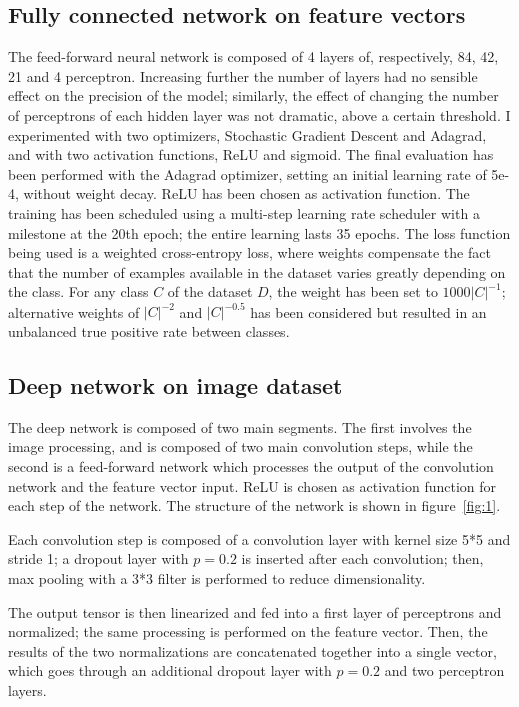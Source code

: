\documentclass[10pt,a4paper,twocolumn]{article}
\begin{document}
\subsection{Fully connected network on feature vectors}

The feed-forward neural network is composed of 4 layers of, respectively, 84, 42, 21 and 4 perceptron.
Increasing further the number of layers had no sensible effect on the precision of the model; similarly, the effect of changing the number of perceptrons of each hidden layer was not dramatic, above a certain threshold.
I experimented with two optimizers, Stochastic Gradient Descent and Adagrad, and with two activation functions, ReLU and sigmoid. The final evaluation has been performed with the Adagrad optimizer, setting an initial learning rate of 5e-4, without weight decay. ReLU has been chosen as activation function. The training has been scheduled using a multi-step learning rate scheduler with a milestone at the 20th epoch; the entire learning lasts 35 epochs. The loss function being used is a weighted cross-entropy loss, where weights compensate the fact that the number of examples available in the dataset varies greatly depending on the class. For any class $C$ of the dataset $D$, the weight has been set to $1000{|C|}^{-1}$; alternative weights of ${|C|}^{-2}$ and $|C|^{-0.5}$ has been considered but resulted in an unbalanced true positive rate between classes.

\subsection{Deep network on image dataset}

The deep network is composed of two main segments. The first involves the image processing, and is composed of two main convolution steps, while the second is a feed-forward network which processes the output of the convolution network and the feature vector input. ReLU is chosen as activation function for each step of the network. The structure of the network is shown in figure~\ref{fig:1}.

Each convolution step is composed of a convolution layer with kernel size 5*5 and stride 1; a dropout layer with $p = 0.2$ is inserted after each convolution; then, max pooling with a 3*3 filter is performed to reduce dimensionality.

The output tensor is then linearized and fed into a first layer of perceptrons and normalized; the same processing is performed on the feature vector. Then, the results of the two normalizations are concatenated together into a single vector, which goes through an additional dropout layer with $p = 0.2$ and two perceptron layers.  
\end{document}
